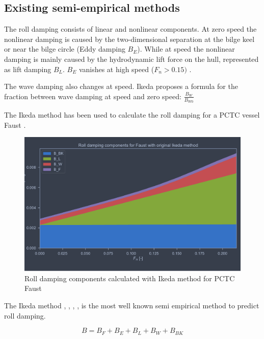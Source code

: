 
\subsection{Existing semi-empirical methods}
\label{se:Existing semi-empirical methods}

The roll damping consists of linear and nonlinear components. At zero speed the nonlinear damping is caused by the two-dimensional separation at the bilge keel or near the bilge circle (Eddy damping $B_E$). While at speed the nonlinear damping is mainly caused by the hydrodynamic lift force on the hull, represented as lift damping $B_L$. $B_E$ vanishes at high speed ($F_n>0.15)$ \cite{ikeda_components_1978}.

The wave damping also changes at speed. Ikeda \cite{ikeda_components_1978} proposes a formula for the fraction between wave damping at speed and zero speed: $\frac{B_W}{B_{W0}}$

The Ikeda method has been used to calculate the roll damping for a PCTC vessel Faust \cite{soder_assessment_2019}.
\begin{figure}[h]
    \centering
    \includegraphics[width=\columnwidth]{figures/ikeda_faust.pdf}
    \caption{Roll damping components calculated with Ikeda method for PCTC Faust}
    \label{fig:ikeda_faust}
\end{figure}



The Ikeda method \cite{ikeda_roll_1978}, \cite{ikeda_eddy_1978}, \cite{ikeda_roll_1979}, \cite{ikeda_components_1978}, \cite{ikeda_velocity_1979} is the most well known semi empirical method to predict roll damping. 

\begin{equation} \label{eq:ikeda}
B = B_F + B_E + B_L + B_W + B_{BK}
\end{equation}

